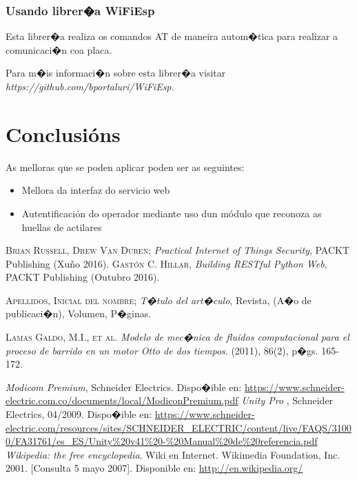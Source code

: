 \documentclass[11pt,twoside]{book}
\begin{document}
\subsection{Usando librer�a WiFiEsp}

Esta librer�a realiza os comandos AT de maneira autom�tica para realizar a comunicaci�n coa placa.

Para m�is informaci�n sobre esta librer�a visitar \textit{https://github.com/bportaluri/WiFiEsp}.

\chapter{Conclusións}

As melloras que se poden aplicar poden ser as seguintes:

\begin{itemize}
    \item Mellora da interfaz do servicio web
    \item Autentificación do operador mediante uso dun módulo que reconoza as huellas de actilares
\end{itemize}


\begin{thebibliography}{99}

 \textsc{Brian Russell, Drew Van Duren}; \textit{Practical Internet of Things Security}, PACKT Publishing (Xuño 2016).
 \textsc{Gastón C. Hillar}, \emph{Building RESTful Python Web}, PACKT Publishing (Outubro 2016).

 \textsc{Apellidos, Inicial del nombre}; \emph{T�tulo del art�culo}, Revista, (A�o de publicaci�n), Volumen, P�ginas.

\bibitem{} \textsc{Lamas Galdo, M.I., et al.} \emph{Modelo de mec�nica de fluidos computacional para el proceso de barrido en un motor Otto de dos tiempos}. 
(2011), 86(2), p�gs. 165-172.

 \textit{Modicom Premium}, Schneider Electrics.
             Dispo�ible en: \url{https://www.schneider-electric.com.co/documents/local/ModiconPremium.pdf}
 \textit{Unity Pro }, Schneider Electrics, 04/2009.
             Dispo�ible en: \url{https://www.schneider-electric.com/resources/sites/SCHNEIDER_ELECTRIC/content/live/FAQS/31000/FA31761/es_ES/Unity%20v41%20-%20Manual%20de%20referencia.pdf}
\bibitem{} \emph{Wikipedia: the free encyclopedia}. Wiki en Internet. Wikimedia Foundation, Inc. 2001. [Consulta 5 mayo 2007]. 
           Disponible en: \url{http://en.wikipedia.org/}
					
\end{thebibliography}
\end{document}
